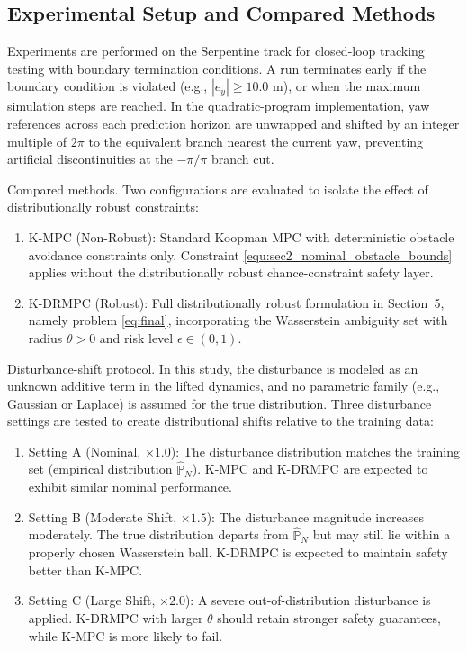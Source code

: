 \documentclass[pdflatex,sn-mathphys,Numbered]{sn-jnl}
\numberwithin{equation}{section}
\begin{document}
	\subsection{Experimental Setup and Compared Methods}
	\label{subsec:protocol}
	
	Experiments are performed on the Serpentine track for closed-loop tracking testing with boundary termination conditions. A run terminates early if the boundary condition is violated (e.g., $|e_y| \ge 10.0$ m), or when the maximum simulation steps are reached. In the quadratic-program implementation, yaw references across each prediction horizon are unwrapped and shifted by an integer multiple of $2\pi$ to the equivalent branch nearest the current yaw, preventing artificial discontinuities at the $-\pi/\pi$ branch cut.
	
	Compared methods. Two configurations are evaluated to isolate the effect of distributionally robust constraints:
	\begin{enumerate}
		\item[i)] K-MPC (Non-Robust): Standard Koopman MPC with deterministic obstacle avoidance constraints only. Constraint \eqref{equ:sec2_nominal_obstacle_bounds} applies without the distributionally robust chance-constraint safety layer.
		\item[ii)] K-DRMPC (Robust): Full distributionally robust formulation in Section~5, namely problem \eqref{eq:final}, incorporating the Wasserstein ambiguity set with radius $\theta > 0$ and risk level $\epsilon \in (0,1)$.
	\end{enumerate}

	Disturbance-shift protocol. In this study, the disturbance is modeled as an unknown additive term in the lifted dynamics, and no parametric family (e.g., Gaussian or Laplace) is assumed for the true distribution. Three disturbance settings are tested to create distributional shifts relative to the training data:
	\begin{enumerate}
		\item[i)] Setting A (Nominal, $\times 1.0$): The disturbance distribution matches the training set (empirical distribution $\hat{\mathbb{P}}_N$). K-MPC and K-DRMPC are expected to exhibit similar nominal performance.
		\item[ii)] Setting B (Moderate Shift, $\times 1.5$): The disturbance magnitude increases moderately. The true distribution departs from $\hat{\mathbb{P}}_N$ but may still lie within a properly chosen Wasserstein ball. K-DRMPC is expected to maintain safety better than K-MPC.
		\item[iii)] Setting C (Large Shift, $\times 2.0$): A severe out-of-distribution disturbance is applied. K-DRMPC with larger $\theta$ should retain stronger safety guarantees, while K-MPC is more likely to fail.
	\end{enumerate}
	
\end{document}
